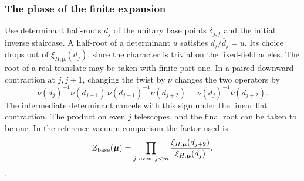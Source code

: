 \subsubsection{The phase of the finite expansion}
Use determinant half-roots \(d_j\) of the unitary base points
\(\delta_{j,f}\) and the initial inverse staircase. A half-root
of a determinant \(u\) satisfies \(d_j/\overline d_j=u\). Its
choice drops out of \(\xi_{H,\boldsymbol\mu}(d_j)\), since the
character is trivial on the fixed-field adeles. The root of a
real translate may be taken with finite part one. In a paired
downward contraction at \(j,j+1\), changing the twist by \(\nu\)
changes the two operators by
\[
 \nu(d_j)^{-1}\nu(d_{j+1})\,
 \nu(d_{j+1})^{-1}\nu(d_{j+2})
 =\nu(d_j)^{-1}\nu(d_{j+2}).
\]
The intermediate determinant cancels with this sign under the
linear flat contraction. The product on even \(j\) telescopes,
and the final root can be taken to be one. In the reference-vacuum
comparison the factor used is
\[
 Z_{\rm base}(\boldsymbol\mu)=
 \prod_{j\ {\rm even},\,j<m}
 \frac{\xi_{H,\boldsymbol\mu}(d_{j+2})}
      {\xi_{H,\boldsymbol\mu}(d_j)}.
\]
.

